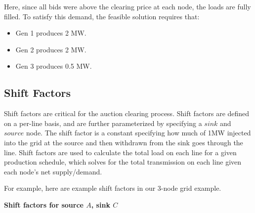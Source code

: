 \documentclass[11pt]{article}
\begin{document}
\begin{center}
\end{center}

Here, since all bids were above the clearing price at each node, the loads are fully filled. To satisfy this demand, the feasible solution requires that:

\begin{itemize}
    \item Gen 1 produces 2 MW.
    \item Gen 2 produces 2 MW.
    \item Gen 3 produces 0.5 MW.
\end{itemize}

\subsection{Shift Factors}

Shift factors are critical for the auction clearing process. Shift factors are defined on a per-line basis, and are further parameterized by specifying a $\textit{sink}$ and $\textit{source}$ node. The shift factor is a constant specifying how much of 1MW injected into the grid at the source and then withdrawn from the sink goes through the line. Shift factors are used to calculate the total load on each line for a given production schedule, which solves for the total transmission on each line given each node's net supply/demand.

For example, here are example shift factors in our 3-node grid example.

\textbf{Shift factors for source $A$, sink $C$}
\end{document}
